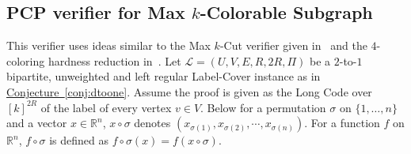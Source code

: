 \documentclass[10pt]{article}
\theoremstyle{definition}
\numberwithin{equation}{section}
\newcommand{\R}{{\mathbb R}}
\newcommand{\expref}[2]{\texorpdfstring{\hyperref[#2]{#1~\ref{#2}}}{#1~\ref{#2}}}
\newcommand{\dtoone}[1]{{\sf ${#1}$-to-$1$}}
\newcommand{\intset}[1]{\ensuremath{\{1,\ldots,{#1}\}}}
\newcommand{\maxcolor}[1]{\texorpdfstring{\textsf{Max ${#1}$-Colorable Subgraph}}{Max {#1}-Colorable Subgraph}}
\newcommand{\maxcut}[1]{{\sf Max ${#1}$-Cut}}
\begin{document}
%
%
%
%
%
%
%
%
%
%
%
%
%
%
%
%
%
%
%
%
%
%
%
%
%
%
%
%
%
%
%
%
%
%
%
%
%
%
%
%
%


\vspace{-1ex}
\subsection{PCP verifier for \maxcolor{k}}
%
This verifier uses ideas similar to the \maxcut{k} verifier given in~\cite{KKMO} and the $4$-coloring hardness reduction in~\cite{DMR}. Let $\mathcal{L} = (U,V,E,R,2 R,\Pi)$ be a \dtoone{2}
bipartite, unweighted and left regular Label-Cover instance as in
\expref{Conjecture}{conj:dtoone}. Assume the proof is given as the Long
Code over $[k]^{2 R}$ of the label of every vertex $v \in V$. Below
for a permutation $\sigma$ on $\intset{n}$ and a vector $x \in \R^n$, $x\circ \sigma$ denotes $(x_{\sigma(1)},x_{\sigma(2)},\cdots,x_{\sigma(n)})$. For a function $f$ on $\R^n$, $f \circ \sigma$ is defined as $f \circ \sigma(x) = f(x \circ \sigma)$.

%
%

%
%
\end{document}
